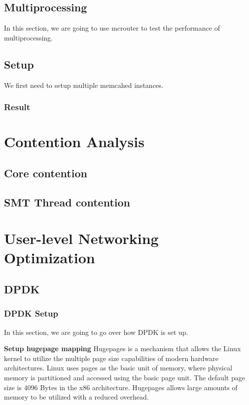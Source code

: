 \documentclass[bsc,frontabs,twoside,singlespacing,parskip,deptreport]{infthesis}     %
\begin{document}
\section{Multiprocessing}
In this section, we are going to use mcrouter to test the performance of multiprocessing.

\section{Setup}
We first need to setup multiple memcahed instances. 

\subsection{Result}

\chapter{Contention Analysis}

\section{Core contention}

\section{SMT Thread contention}





\chapter{User-level Networking Optimization}

\section{DPDK}

\subsection{DPDK Setup}

In this section, we are going to go over how DPDK is set up.


\textbf{Setup hugepage mapping} Hugepages is a mechanism that allows the Linux kernel to utilize the multiple page size capabilities of modern hardware architectures. Linux uses pages as the basic unit of memory, where physical memory is partitioned and accessed using the basic page unit. The default page size is 4096 Bytes in the x86 architecture. Hugepages allows large amounts of memory to be utilized with a reduced overhead.
\end{document}
